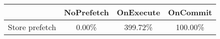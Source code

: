 \begin{tabular}{ l|ccc }
 & NoPrefetch & OnExecute & OnCommit\\ \hline
Store prefetch & 0.00\% & 399.72\% & 100.00\%\\ \hline
\end{tabular}

